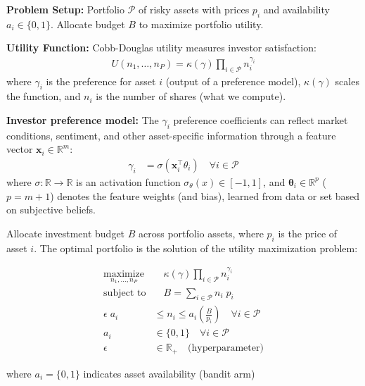 \documentclass[aspectratio=169]{beamer}
\begin{document}
\begin{frame}
\textbf{Problem Setup:} Portfolio $\mathcal{P}$ of risky assets with prices $p_i$ and availability $a_i \in \{0,1\}$. Allocate budget $B$ to maximize portfolio utility.
\end{frame}

\begin{frame}
\textbf{Utility Function:} Cobb-Douglas utility measures investor satisfaction:
\begin{align*}
U(n_1, \dots, n_P) = \kappa(\gamma) \prod_{i \in \mathcal{P}} n_i^{\gamma_i}
\end{align*}
where $\gamma_i$ is the preference for asset $i$ (output of a preference model), $\kappa(\gamma)$ scales the function, and $n_i$ is the number of shares (what we compute).
\end{frame}

\begin{frame}
\textbf{Investor preference model:} The $\gamma_{i}$ preference coefficients can reflect market conditions, sentiment, and other asset-specific information through a feature vector $\mathbf{x}_{i}\in\mathbb{R}^{m}$:
\begin{align*}
\gamma_{i} & = \sigma\left(\mathbf{x}^{\top}_{i}\theta_{i}\right)\quad\forall{i}\in\mathcal{P}
\end{align*}
where $\sigma:\mathbb{R}\rightarrow\mathbb{R}$ is an activation function $\sigma_{\theta}(x)\in[-1,1]$,
and $\mathbf{\theta}_{i}\in\mathbb{R}^{p}$ ($p=m+1$) denotes the feature weights (and bias), learned from data or set based on subjective beliefs.
\end{frame}

\begin{frame}
Allocate investment budget $B$ across portfolio assets, where $p_i$ is the price of asset $i$.
The optimal portfolio is the solution of the utility maximization problem:
\begin{mdframed}[backgroundcolor=black!10]
\begin{align*}
    \underset{n_{1},\dots,n_{P}}{\text{maximize}} &\quad \kappa(\gamma)\prod_{i\in\mathcal{P}}n_{i}^{\gamma_{i}} \\
    \text{subject to}&\quad B =  \sum_{i\in\mathcal{P}}n_{i}\;{p}_{i}\\
    \epsilon\;{a_{i}}&\leq n_{i} \leq{a_{i}}\left(\frac{B}{p_{i}}\right)\quad{\forall{i}\in\mathcal{P}}\\
    a_{i} &\in\{0,1\}\quad{\forall{i}\in\mathcal{P}}\\
    \epsilon &\in\mathbb{R}_{+} \quad\text{(hyperparameter)}
\end{align*}
\end{mdframed}
where $a_{i} = \{0,1\}$ indicates asset availability (bandit arm)
\end{frame}
\end{document}
